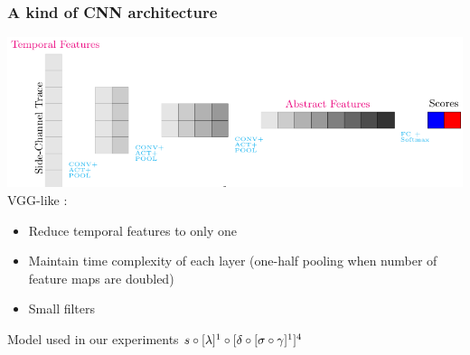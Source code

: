 \begin{frame}
\frametitle{A kind of CNN architecture}
\includegraphics[width=\textwidth]{../tikz_per_manuscritto/convnet_arch.pdf} \\VGG-like \cite{simonyan2014very}:
\begin{itemize}
\item Reduce temporal features to only one
\item Maintain time complexity of each layer (one-half pooling when number of feature maps are doubled)
\item Small filters
\end{itemize}
\begin{block}{Model used in our experiments}
$s \circ [\lambda]^1 \circ[\delta \circ [\sigma \circ \gamma  ]^1 ]^4$
\end{block}

\end{frame}


